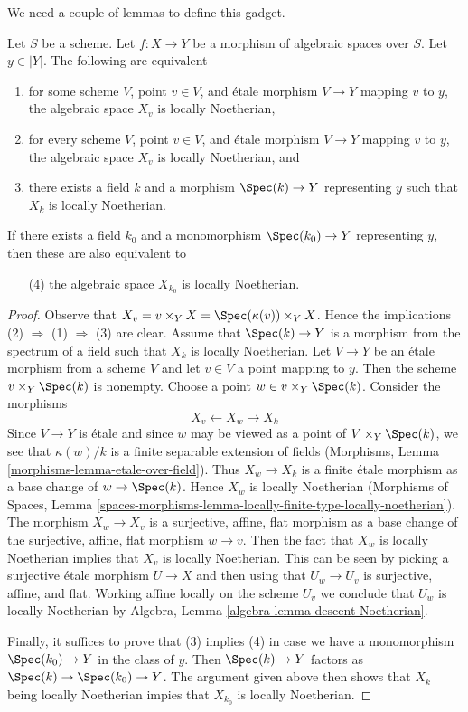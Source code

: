 \noindent
We need a couple of lemmas to define this gadget.

\begin{lemma}
\label{lemma-locally-noetherian-fibre}
Let $S$ be a scheme. Let $f : X \to Y$ be a morphism of algebraic spaces
over $S$. Let $y \in |Y|$. The following are equivalent
\begin{enumerate}
\item for some scheme $V$, point $v \in V$, and \'etale morphism $V \to Y$
mapping $v$ to $y$, the algebraic space $X_v$ is locally Noetherian,
\item for every scheme $V$, point $v \in V$, and \'etale morphism $V \to Y$
mapping $v$ to $y$, the algebraic space $X_v$ is locally Noetherian, and
\item there exists a field $k$ and a morphism $\Spec(k) \to Y$ representing
$y$ such that $X_k$ is locally Noetherian.
\end{enumerate}
If there exists a field $k_0$ and a monomorphism $\Spec(k_0) \to Y$
representing $y$, then these are also equivalent to
\begin{enumerate}
\item[(4)] the algebraic space $X_{k_0}$ is locally Noetherian.
\end{enumerate}
\end{lemma}

\begin{proof}
Observe that $X_v = v \times_Y X = \Spec(\kappa(v)) \times_Y X$.
Hence the implications (2) $\Rightarrow$ (1) $\Rightarrow$ (3) are clear.
Assume that $\Spec(k) \to Y$ is a morphism from the spectrum of a field
such that $X_k$ is locally Noetherian. Let $V \to Y$ be an \'etale morphism
from a scheme $V$ and let $v \in V$ a point mapping to $y$.
Then the scheme $v \times_Y \Spec(k)$ is nonempty. Choose a
point $w \in v \times_Y \Spec(k)$. Consider the morphisms
$$
X_v \longleftarrow X_w \longrightarrow X_k
$$
Since $V \to Y$ is \'etale and since $w$ may be viewed as a point of
$V \times_Y \Spec(k)$, we see that $\kappa(w)/k$
is a finite separable extension of fields
(Morphisms, Lemma \ref{morphisms-lemma-etale-over-field}).
Thus $X_w \to X_k$ is a finite \'etale morphism as a base change of
$w \to \Spec(k)$. Hence $X_w$ is locally Noetherian
(Morphisms of Spaces, Lemma
\ref{spaces-morphisms-lemma-locally-finite-type-locally-noetherian}).
The morphism $X_w \to X_v$ is a surjective, affine, flat morphism
as a base change of the surjective, affine, flat morphism $w \to v$.
Then the fact that $X_w$ is locally Noetherian implies that
$X_v$ is locally Noetherian. This can be seen by picking a
surjective \'etale morphism $U \to X$ and then using that
$U_w \to U_v$ is surjective, affine, and flat. Working
affine locally on the scheme $U_v$ we conclude
that $U_w$ is locally Noetherian by
Algebra, Lemma \ref{algebra-lemma-descent-Noetherian}.

\medskip\noindent
Finally, it suffices to prove that (3) implies (4)
in case we have a monomorphism $\Spec(k_0) \to Y$ in the class of $y$.
Then $\Spec(k) \to Y$ factors as $\Spec(k) \to \Spec(k_0) \to Y$.
The argument given above then shows that $X_k$ being
locally Noetherian impies that $X_{k_0}$ is locally Noetherian.
\end{proof}

